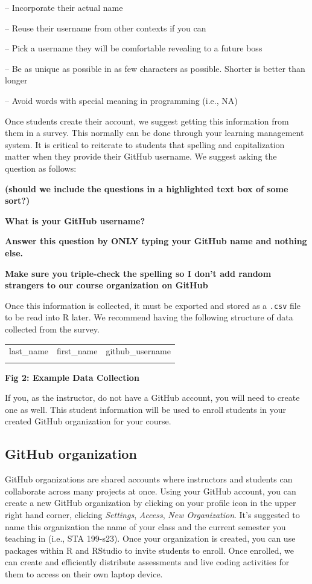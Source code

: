 \documentclass[
  12pt]{article}
\begin{document}
-- Incorporate their actual name

-- Reuse their username from other contexts if you can

-- Pick a username they will be comfortable revealing to a future boss

-- Be as unique as possible in as few characters as possible. Shorter is
better than longer

-- Avoid words with special meaning in programming (i.e., NA)

Once students create their account, we suggest getting this information
from them in a survey. This normally can be done through your learning
management system. It is critical to reiterate to students that spelling
and capitalization matter when they provide their GitHub username. We
suggest asking the question as follows:

\textbf{(should we include the questions in a highlighted text box of
some sort?)}

\textbf{What is your GitHub username?}

\textbf{Answer this question by ONLY typing your GitHub name and nothing
else.}

\textbf{Make sure you triple-check the spelling so I don't add random
strangers to our course organization on GitHub}

Once this information is collected, it must be exported and stored as a
\texttt{.csv} file to be read into R later. We recommend having the
following structure of data collected from the survey.

\begin{longtable}[]{@{}lll@{}}
\toprule\noalign{}
\endhead
\bottomrule\noalign{}
\endlastfoot
last\_name & first\_name & github\_username \\
& & \\
\end{longtable}

\textbf{Fig 2: Example Data Collection}

If you, as the instructor, do not have a GitHub account, you will need
to create one as well. This student information will be used to enroll
students in your created GitHub organization for your course.

\hypertarget{github-organization}{%
\subsection{GitHub organization}\label{github-organization}}

GitHub organizations are shared accounts where instructors and students
can collaborate across many projects at once. Using your GitHub account,
you can create a new GitHub organization by clicking on your profile
icon in the upper right hand corner, clicking \emph{Settings},
\emph{Access}, \emph{New Organization}. It's suggested to name this
organization the name of your class and the current semester you
teaching in (i.e., STA 199-s23). Once your organization is created, you
can use packages within R and RStudio to invite students to enroll. Once
enrolled, we can create and efficiently distribute assessments and live
coding activities for them to access on their own laptop device.
\end{document}
